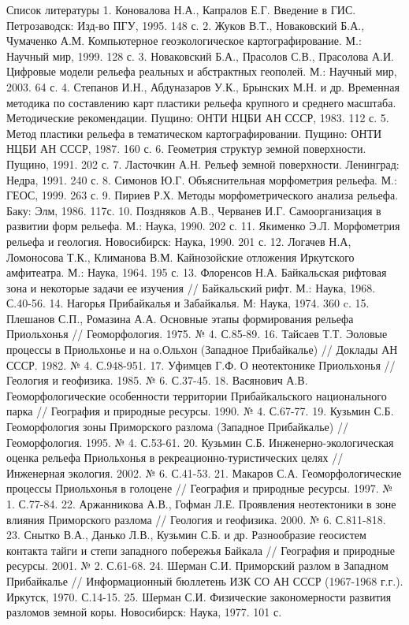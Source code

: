 \documentclass[runningheads]{AIIT}
\begin{document}
Список литературы
1. Коновалова Н.А., Капралов Е.Г. Введение в ГИС. Петрозаводск: Изд-во ПГУ, 1995. 148 с.
2. Жуков В.Т., Новаковский Б.А., Чумаченко А.М. Компьютерное геоэкологическое картографирование. М.: Научный мир, 1999. 128 с.
3. Новаковский Б.А., Прасолов С.В., Прасолова А.И. Цифровые модели рельефа реальных и абстрактных геополей. М.: Научный мир, 2003. 64 с.
4. Степанов И.Н., Абдуназаров У.К., Брынских М.Н. и др. Временная методика по составлению карт пластики рельефа крупного и среднего масштаба. Методические рекомендации. Пущино: ОНТИ НЦБИ АН СССР, 1983. 112 с.
5. Метод пластики рельефа в тематическом картографировании. Пущино: ОНТИ НЦБИ АН СССР, 1987. 160 с.
6. Геометрия структур земной поверхности. Пущино, 1991. 202 с.
7. Ласточкин А.Н. Рельеф земной поверхности. Ленинград: Недра, 1991. 240 с.
8. Симонов Ю.Г. Объяснительная морфометрия рельефа. М.: ГЕОС, 1999. 263 с.
9. Пириев Р.Х. Методы морфометрического анализа рельефа. Баку: Элм, 1986. 117с.
10. Поздняков А.В., Черванев И.Г. Самоорганизация в развитии форм рельефа. М.: Наука, 1990. 202 с.
11. Якименко Э.Л. Морфометрия рельефа и геология. Новосибирск: Наука, 1990. 201 с.
12. Логачев Н.А, Ломоносова Т.К., Климанова В.М. Кайнозойские отложения Иркутского амфитеатра. М.: Наука, 1964. 195 с.
13. Флоренсов Н.А. Байкальская рифтовая зона и некоторые задачи ее изучения // Байкальский рифт. М.: Наука, 1968. С.40-56.
14. Нагорья Прибайкалья и Забайкалья. М: Наука, 1974. 360 c.
15. Плешанов С.П., Ромазина А.А. Основные этапы формирования рельефа Приольхонья // Геоморфология. 1975. № 4. С.85-89.
16. Тайсаев Т.Т. Эоловые процессы в Приольхонье и на о.Ольхон (Западное Прибайкалье) //  Доклады АН СССР. 1982. № 4. С.948-951.
17. Уфимцев Г.Ф. О неотектонике Приольхонья // Геология и геофизика. 1985. № 6. С.37-45.
18. Васянович А.В. Геоморфологические особенности территории Прибайкальского национального парка // География и природные ресурсы. 1990. № 4. С.67-77.
19. Кузьмин С.Б. Геоморфология зоны Приморского разлома (Западное Прибайкалье) // Геоморфология. 1995. № 4. С.53-61.
20. Кузьмин С.Б. Инженерно-экологическая оценка рельефа Приольхонья в рекреационно-туристических целях // Инженерная экология. 2002. № 6. С.41-53.
21. Макаров С.А. Геоморфологические процессы Приольхонья в голоцене // География и природные ресурсы. 1997. № 1. С.77-84.
22. Аржанникова А.В., Гофман Л.Е. Проявления неотектоники в зоне влияния Приморского разлома // Геология и геофизика. 2000. № 6. С.811-818.
23. Снытко В.А., Данько Л.В., Кузьмин С.Б. и др. Разнообразие геосистем контакта тайги и степи западного побережья Байкала // География и природные ресурсы. 2001. № 2. С.61-68.
24. Шерман С.И. Приморский разлом в Западном Прибайкалье // Информационный бюллетень ИЗК СО АН СССР (1967-1968 г.г.). Иркутск, 1970. С.14-15.
25. Шерман С.И. Физические закономерности развития разломов земной коры. Новосибирск: Наука, 1977. 101 с.
\end{document}
